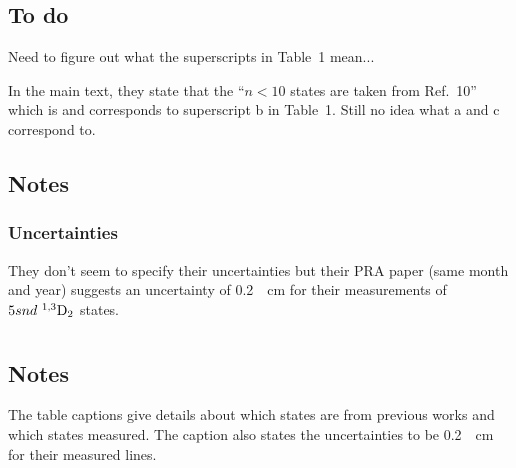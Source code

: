 \documentclass{article}
\newcommand{\tsup}{\textsuperscript}													%
\newcommand{\tsub}{\textsubscript}														%
\newcommand{\SLJ}[3]{\tsup{#1}\textnormal{#2}\tsub{#3}}
\newcommand{\nSLJ}[4]{{#1}\textnormal{ }\SLJ{#2}{#3}{#4}}
\begin{document}
\subsection{To do}

Need to figure out what the superscripts in Table~1 mean...

In the main text, they state that the ``${n < 10}$ states are taken from Ref.~10'' which is \cite{moo_1952v2} and corresponds to superscript b in Table~1. Still no idea what a and c correspond to.

\subsection{Notes}

\subsubsection{Uncertainties}

They don't seem to specify their uncertainties but their PRA paper \cite{daz_1995} (same month and year) suggests an uncertainty of \SI{0.2}{\per\cm} for their measurements of $\nSLJ{5snd}{1,3}{D}{2}$ states. 

\section{}

\subsection{Notes}

The table captions give details about which states are from previous works and which states \citeauthor{dai_1995} measured. The caption also states the uncertainties to be \SI{0.2}{\per\cm} for their measured lines.

\printbibliography
\end{document}
